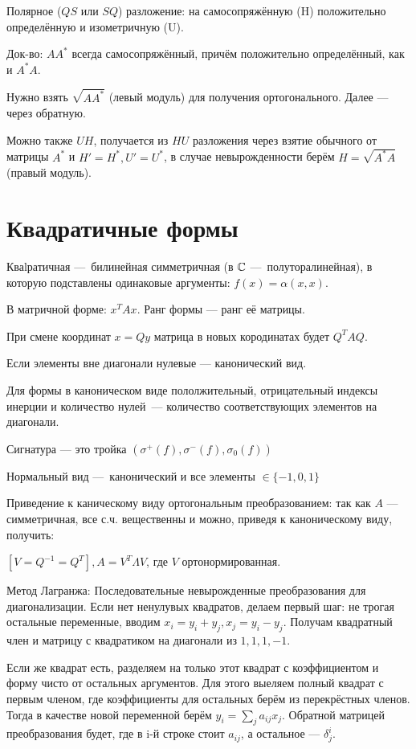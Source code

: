 \documentclass[12pt, a4paper]{article}
\begin{document}
Полярное ($QS$ или $SQ$) разложение: на самосопряжённую (H) положительно определённую и изометричную (U).

Док-во: $AA^*$ всегда самосопряжённый, причём положительно определённый, как и $A^*A$.

Нужно взять $\sqrt{A A^*}$ (левый модуль) для получения ортогонального. Далее — через обратную.

Можно также $UH$, получается из $HU$ разложения через взятие обычного от матрицы $A^*$ и $H' = H^*, U' = U^*$, 
в случае невырожденности берём $H = \sqrt{A^* A}$ (правый модуль).




\section{Квадратичные формы}

Кваlратичная — билинейная симметричная (в ${\mathbb{C}}$ — полуторалинейная), в которую подставлены одинаковые аргументы: $f(x) = \alpha (x, x)$.

В матричной форме: $x^T A x$.
Ранг формы — ранг её матрицы.

При смене координат $x = Q y$ матрица в новых кородинатах будет $Q^T A Q$.

Если элементы вне диагонали нулевые — канонический вид.

Для формы в каноническом виде пололжительный, отрицательный индексы инерции и количество нулей — количество соответствующих элементов на диагонали.

Сигнатура — это тройка $(\sigma^+(f), \sigma^-(f), \sigma_0(f))$

Нормальный вид — канонический и все элементы $\in \{-1, 0, 1\}$

Приведение к каническому виду ортогональным преобразованием: так как $A$ — симметричная, все с.ч. вещественны и можно, приведя к каноническому виду, получить:

$[V = Q^{-1} = Q^T], A = V^T \Lambda V$, где $V$ ортонормированная.

Метод Лагранжа: Последовательные невырожденные преобразования для диагонализации. 
Если нет ненулувых квадратов, делаем первый шаг:
не трогая остальные переменные, вводим $x_i = y_i + y_j, x_j = y_i - y_j$. 
Получам квадратный член и матрицу с квадратиком на диагонали из $1, 1, 1, -1$.

Если же квадрат есть, разделяем на только этот квадрат с коэффициентом и форму чисто от остальных аргументов.
Для этого выеляем полный квадрат с первым членом, где коэффициенты для остальных берём из перекрёстных членов.
Тогда в качестве новой переменной берём $y_i = \sum_j a_{ij} x_j$. Обратной матрицей преобразования будет, где в i-й строке стоит $a_{ij}$, а остальное — $\delta^i_j$.
\end{document}
